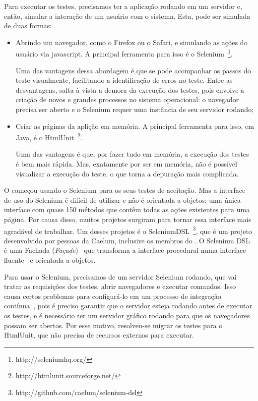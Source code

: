 Para executar os testes, precisamos ter a aplicação rodando em um servidor e, então, simular a interação de um usuário com o sistema. Esta, pode ser simulada de duas formas:

\begin{itemize}
	\item{Abrindo um navegador, como o Firefox ou o Safari, e simulando as ações do usuário via javascript. A principal	ferramenta para isso é o Selenium~\footnote{http://seleniumhq.org/}. 

Uma das vantagens dessa abordagem é que se pode acompanhar os passos do teste visualmente, facilitando a identificação de erros no teste. Entre as desvantagens, salta à vista a demora da execução dos testes, pois envolve a criação de novos e grandes processos no sistema operacional: o navegador precisa ser aberto e o Selenium requer uma instância de seu servidor rodando;}
	\item{Criar as páginas da aplição em memória. A principal ferramenta para isso, em Java, é o HtmlUnit~\footnote{http://htmlunit.sourceforge.net/}. 

Uma das vantagens é que, por fazer tudo em memória, a execução dos testes é bem mais rápida. Mas, exatamente por ser em memória, não é possível visualizar a execução do teste, o que torna a depuração mais complicada.}
\end{itemize}

O \calopsita{} começou usando o Selenium para os seus testes de aceitação. Mas a interface de uso do Selenium é difícil de utilizar e não é orientada a objetos: uma única interface com quase 150 métodos que contêm todas as ações existentes para uma página. Por causa disso, muitos projetos surgiram para tornar essa interface mais agradável de trabalhar. Um desses projetos é o SeleniumDSL~\footnote{http://github.com/caelum/selenium-dsl}, que é um projeto \opensource{} desenvolvido por pessoas da Caelum, inclusive os membros do \calopsita{}. O Selenium DSL é uma Fachada (\textit{Façade})~\cite{gof} que transforma a interface procedural numa interface fluente~\cite{dsl} e orientada a objetos.

Para usar o Selenium, precisamos de um servidor Selenium rodando, que vai tratar as requisições dos testes, abrir navegadores e executar comandos. Isso causa certos problemas para configurá-lo em um processo de integração contínua~\cite{ci}, pois é preciso garantir que o servidor esteja rodando antes de executar os testes, e é necessário ter um servidor gráfico rodando para que os navegadores possam ser abertos. Por esse motivo, resolveu-se migrar os testes para o HtmlUnit, que não precisa de recursos externos para executar.

